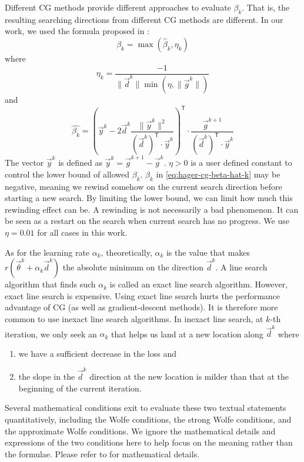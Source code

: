 Different CG methods provide different approaches to evaluate $\beta_k$.
That is, the resulting searching directions from different CG methods are different.
In our work, we used the formula proposed in \cite{hager_new_2005,hager_algorithm_2006}:
\begin{equation}\label{eq:hager-cg-beta}
    \beta_k = \max\left(\hat{\beta}_k, \eta_k\right)
\end{equation}
where
\begin{equation}\label{eq:hager-cg-etak}
    \eta_k = \frac{-1}{\lVert\vec{d}^k\rVert \min \left(\eta, \lVert\vec{g}^k\rVert\right)}
\end{equation}
and
\begin{equation}\label{eq:hager-cg-beta-hat-k}
    \hat{\beta_k} = \left(
        \vec{y}^k -
        2\vec{d}^k
        \frac{\lVert\vec{y}^k\rVert^2}{\left(\vec{d}^k\right)^\mathsf{T}\cdot \vec{y}^k}
    \right)^\mathsf{T}
    \cdot 
    \frac{\vec{g}^{k+1}}{\left(\vec{d}^k\right)^\mathsf{T}\cdot\vec{y}^k}
\end{equation}
The vector $\vec{y}^k$ is defined as $\vec{y}^k=\vec{g}^{k+1}-\vec{g}^k$.
$\eta > 0$ is a user defined constant to control the lower bound of allowed $\beta_k$.
$\hat{\beta_k}$ in \eqref{eq:hager-cg-beta-hat-k} may be negative, meaning we rewind somehow on the current search direction before starting a new search.
By limiting the lower bound, we can limit how much this rewinding effect can be.
A rewinding is not necessarily a bad phenomenon.
It can be seen as a restart on the search when current search has no progress.
We use $\eta=0.01$ for all cases in this work.

As for the learning rate $\alpha_k$, theoretically, $\alpha_k$ is the value that makes $r(\vec{\theta}^k+\alpha_k\vec{d}^k)$ the absolute minimum on the direction $\vec{d}^k$.
A line search algorithm that finds such $\alpha_k$ is called an exact line search algorithm.
However, exact line search is expensive.
Using exact line search hurts the performance advantage of CG (as well as gradient-descent methods).
It is therefore more common to use inexact line search algorithms.
In inexact line search, at $k$-th iteration, we only seek an $\alpha_k$ that helps us land at a new location along $\vec{d}^k$ where
\begin{enumerate}[noitemsep,topsep=-12pt]
    \item we have a sufficient decrease in the loss and
    \item the slope in the $\vec{d}^k$ direction at the new location is milder than that at the beginning of the current iteration.
\end{enumerate}
Several mathematical conditions exit to evaluate these two textual statements quantitatively, including the Wolfe conditions, the strong Wolfe conditions, and the approximate Wolfe conditions.
We ignore the mathematical details and expressions of the two conditions here to help focus on the meaning rather than the formulae.
Please refer to \cite[Chapter~3]{nocedal_numerical_2006} for mathematical details.

